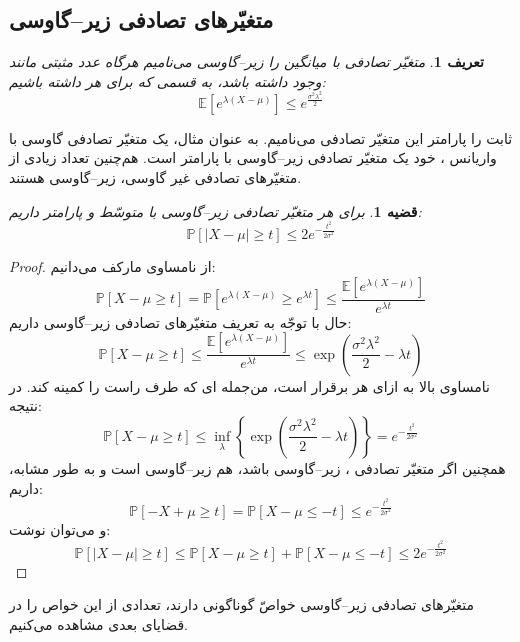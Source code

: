 \documentclass[a4paper,12pt]{article}
\newtheorem{den}{{\large\bf تعریف}}[section]
\newtheorem{thm}{{\large\bf قضیه}}[section]
\newcommand{\E}{\mathbb{E}}
\newcommand{\Prob}{\mathbb{P}}
\newcommand{\R}{\mathbb{R}}
\begin{document}
	\subsection{متغیّرهای تصادفی زیر--گاوسی}
	\begin{den}
		متغیّر تصادفی
		با میانگین
		را زیر--گاوسی می‌نامیم هرگاه عدد مثبتی مانند
		\lr{$\sigma$}
		وجود داشته باشد، به قسمی که برای هر
		داشته باشیم:
		\[\E\left[e^{\lambda(X-\mu)}\right]\leq e^{\frac{\sigma^2\lambda^2}{2}}\]
	\end{den}
	ثابت
	\lr{$\sigma$}
	را پارامتر این متغیّر تصادفی می‌نامیم. به عنوان مثال، یک متغیّر تصادفی گاوسی با واریانس
	،
	خود یک متغیّر تصادفی زیر--گاوسی با پارامتر
	\lr{$\sigma$}
	است. هم‌چنین تعداد زیادی از متغیّرهای تصادفی غیر گاوسی، زیر--گاوسی هستند.
	
	\begin{thm}	\label{thm1subgaussian}
		برای هر متغیّر تصادفی زیر--گاوسی 
		با متوسّط
		\lr{$\mu = \E[X]$}
		و پارامتر
		\lr{$\sigma$}
		داریم:
		\begin{equation}
		\Prob[|X-\mu|\geq t] \leq 2e^{-\frac{t^2}{2\sigma^2}}
		\end{equation}
	\end{thm}
	\begin{proof}
		از نامساوی مارکف می‌دانیم:
		\[\Prob[X-\mu\geq t] = \Prob[e^{\lambda (X-\mu)} \geq e^{\lambda t}] \leq \frac{\E\left[e^{\lambda (X-\mu)}\right]}{e^{\lambda t}} \]
		حال با توجّه به تعریف متغیّرهای تصادفی زیر--گاوسی داریم:
		\[\Prob[X-\mu\geq t] \leq \frac{\E\left[e^{\lambda (X-\mu)}\right]}{e^{\lambda t}} \leq \exp(\frac{\sigma^2\lambda^2}{2} - \lambda t)\]
		نامساوی بالا به ازای هر
		\lr{$\lambda\in\R$}
		برقرار است، من‌جمله
		\lr{$\lambda$}ای
		که طرف راست را کمینه کند. در نتیجه:
		\begin{equation}
		\Prob[X-\mu\geq t] \leq \inf_\lambda\left\{\exp(\frac{\sigma^2\lambda^2}{2} - \lambda t) \right\} = e^{-\frac{t^2}{2\sigma^2}}
		\end{equation}
		همچنین اگر متغیّر تصادفی
		،
		زیر--گاوسی باشد، 
		هم زیر--گاوسی است و به طور مشابه، داریم:
		\[\Prob[-X+\mu\geq t] = \Prob[X-\mu\leq -t]\leq  e^{-\frac{t^2}{2\sigma^2}}\]
		و می‌توان نوشت:
		\[\Prob[|X-\mu|\geq t] \leq \Prob[X-\mu\geq t] + \Prob[X-\mu\leq -t] \leq 2e^{-\frac{t^2}{2\sigma^2}}\]
	\end{proof}
	
	متغیّرهای تصادفی زیر--گاوسی خواصّ گوناگونی دارند، تعدادی از این خواص را در قضایای بعدی مشاهده می‌کنیم.
	
\end{document}
